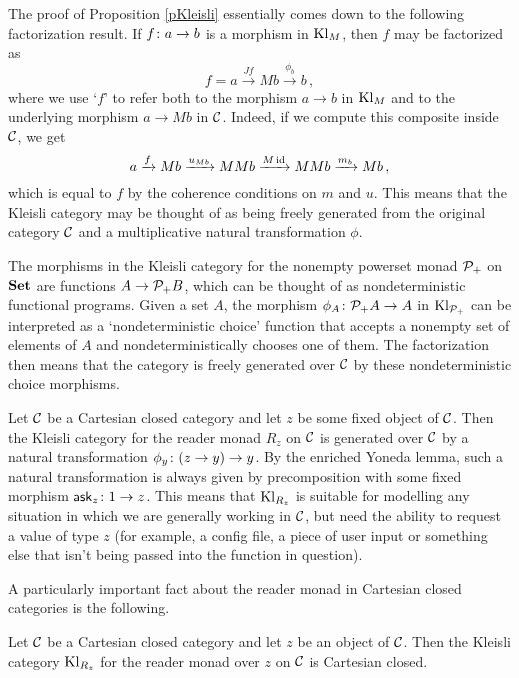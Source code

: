 \documentclass{article}
\begin{document}
The proof of Proposition \ref{pKleisli} essentially comes down to the following factorization result.  
If $f\colon a \to b$ is a morphism in $\operatorname{Kl}_M$, then $f$ may be factorized as
\[
  f = a \xrightarrow{Jf}
  Mb \xrightarrow{\phi_b}
  b\,,
  \]
where we use `$f$' to refer both to the morphism $a\to b$ in $\operatorname{Kl}_M$ and to the underlying morphism $a \to Mb$ in ${\mathcal{C}}$.
Indeed, if we compute this composite inside ${\mathcal{C}}$, we get
\[
  a \xrightarrow{f}
  Mb \xrightarrow{u_{Mb}}
  MMb \xrightarrow{M\operatorname{id}}
  MMb \xrightarrow{m_b}
  Mb\,,
  \]
which is equal to $f$ by the coherence conditions on $m$ and $u$.
This means that the Kleisli category may be thought of as being freely generated from the original category ${\mathcal{C}}$ and a multiplicative natural transformation $\phi$.

\begin{example}
  The morphisms in the Kleisli category for the nonempty powerset monad $\mathcal P_+$ on ${\normalfont\textbf{Set}}$ are functions $A \to \mathcal P_+B$, which can be thought of as nondeterministic functional programs.  
  Given a set $A$, the morphism $\phi_A\colon \mathcal P_+A \to A$ in $\operatorname{Kl}_{\mathcal P_+}$ can be interpreted as a `nondeterministic choice' function that accepts a nonempty set of elements of $A$ and nondeterministically chooses one of them.
  The factorization then means that the category is freely generated over ${\mathcal{C}}$ by these nondeterministic choice morphisms.
\end{example}
\begin{example}
  Let ${\mathcal{C}}$ be a Cartesian closed category and let $z$ be some fixed object of ${\mathcal{C}}$.  
  Then the Kleisli category for the reader monad $R_z$ on ${\mathcal{C}}$ is generated over ${\mathcal{C}}$ by a natural transformation $\phi_y\colon (z \to y) \to y$.  
  By the enriched Yoneda lemma, such a natural transformation is always given by precomposition with some fixed morphism $\operatorname{{\mathsf{ask}}}_z\colon 1 \to z$.  
  This means that $\operatorname{Kl}_{R_z}$ is suitable for modelling any situation in which we are generally working in ${\mathcal{C}}$, but need the ability to request a value of type $z$ (for example, a config file, a piece of user input or something else that isn't being passed into the function in question).
  \label{ExReaderMonadKleisli}
\end{example}

A particularly important fact about the reader monad in Cartesian closed categories is the following.

\begin{theorem}
  Let ${\mathcal{C}}$ be a Cartesian closed category and let $z$ be an object of ${\mathcal{C}}$.  
  Then the Kleisli category $\operatorname{Kl}_{R_z}$ for the reader monad over $z$ on ${\mathcal{C}}$ is Cartesian closed.
  \label{FunctionalCompletenessCcc}
\end{theorem}
\end{document}
